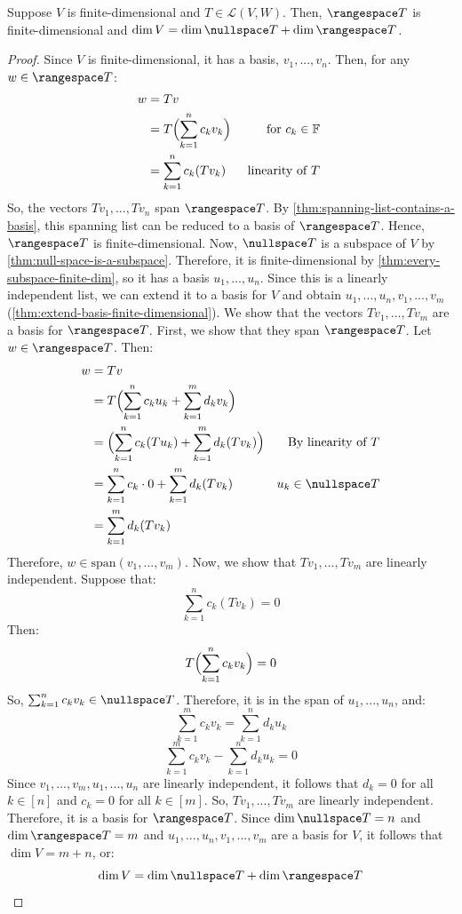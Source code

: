 \documentclass{article}
\begin{document}
\begin{theorem}
  \label{thm:fundamental-thm-of-linear-maps}
  Suppose $V$ is finite-dimensional and $T \in \mathcal{L}(V,
  W)$. Then, $\rangespace T$ is finite-dimensional and $\dim V = \dim
  \nullspace T + \dim \rangespace T$. 
\end{theorem}
\begin{proof}
  Since $V$ is finite-dimensional, it has a basis, $v_1, ...,
  v_n$. Then, for any $w \in \rangespace T$:
  \begin{align*}
    w &= Tv \\
    &= T\Bigl( \sum_{k=1}^n c_k v_k \Bigr) & \text{ for $c_k \in
                                             \mathbb{F}$ } \\
    &= \sum_{k=1}^n c_k (Tv_k) & \text{ linearity of $T$ }
  \end{align*}
  So, the vectors $Tv_1, ..., Tv_n$ span $\rangespace T$. By
  \cref{thm:spanning-list-contains-a-basis}, this spanning list can be
  reduced to a basis of $\rangespace T$. Hence, $\rangespace T$ is
  finite-dimensional. Now, $\nullspace T$ is a subspace of $V$ by
  \cref{thm:null-space-is-a-subspace}. Therefore, it is
  finite-dimensional by \cref{thm:every-subspace-finite-dim}, so it
  has a basis $u_1, ..., u_n$. Since this is a linearly independent
  list, we can extend it to a basis for $V$ and obtain $u_1, ..., u_n,
  v_1, ..., v_m$ (\cref{thm:extend-basis-finite-dimensional}). We show
  that the vectors $Tv_1, ..., Tv_m$ are a basis for $\rangespace
  T$. First, we show that they span $\rangespace T$. Let $w \in
  \rangespace T$. Then:
  \begin{align*}
    w &= Tv \\
      &= T\Bigl( \sum_{k=1}^n c_k u_k + \sum_{k=1}^m d_k v_k\Bigr) \\
    &= \Bigl( \sum_{k=1}^n c_k (Tu_k) + \sum_{k=1}^m d_k (Tv_k) \Bigr)
      & \text{By linearity of $T$}
    \\
    &= \sum_{k=1}^n c_k \cdot 0 + \sum_{k=1}^m d_k (Tv_k) & \text{$u_k \in \nullspace T$} \\
    &= \sum_{k=1}^m d_k (Tv_k) \\
  \end{align*}
  Therefore, $w \in \text{span}(v_1, ..., v_m)$. Now, we show that
  $Tv_1, ..., Tv_m$ are linearly independent. Suppose that:
  $$\sum_{k=1}^n c_k (Tv_k) = 0$$
  Then:
  $$T\Bigl( \sum_{k=1}^n c_k v_k \Bigr) = 0$$
  So, $\sum_{k=1}^n c_k v_k \in \nullspace T$. Therefore, it is in the span
  of $u_1, ..., u_n$, and:
  $$\sum_{k=1}^m c_k v_k = \sum_{k=1}^n d_k u_k$$
  $$\sum_{k=1}^m c_k v_k - \sum_{k=1}^n d_k u_k = 0$$
  Since $v_1, ..., v_m, u_1, ..., u_n$ are linearly independent, it
  follows that $d_k = 0$ for all $k \in [n]$ and $c_k = 0$ for all
  $k \in [m]$. So, $Tv_1, ..., Tv_m$ are linearly
  independent. Therefore, it is a basis for $\rangespace T$. Since
  $\dim \nullspace T = n$ and $\dim \rangespace T = m$ and $u_1, ..., u_n,
  v_1, ..., v_m$ are a basis for $V$, it follows that $\dim V = m +
  n$, or:
  $$\dim V = \dim \nullspace T + \dim \rangespace T$$
\end{proof}
\end{document}
